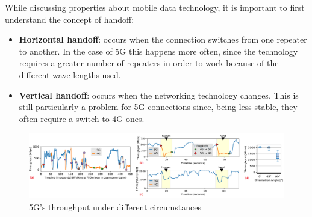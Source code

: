 While discussing properties about mobile data technology, it is important to first understand the concept of handoff:
\begin{itemize}
    \item \textbf{Horizontal handoff}: occurs when the connection switches from one repeater to another. In the case of 5G this happens more often, since the technology requires a greater number of repeaters in order to work because of the different wave lengths used.
    \item \textbf{Vertical handoff}: occurs when the networking technology changes. This is still particularly a problem for 5G connections since, being less stable, they often require a switch to 4G ones.  
\end{itemize}
\begin{figure}[H]
    \centering
    \includegraphics[width=\linewidth]{document/chapters/chapter_3/images/5G_performances.png}
    \caption{5G's throughput under different circumstances \cite{5g_performances}}
    \label{fig:5G_performances_graphs}
\end{figure}

